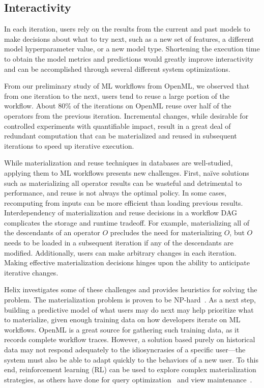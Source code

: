\documentclass[11pt,dvipdfmx]{article}
\newcommand{\topic}[1]{\vspace{-3.5pt}\smallskip \smallskip \noindent{\bf #1.}}
\newcommand{\helix}{{\sc Helix}\xspace}
\begin{document}
\subsection{Interactivity\label{sec:interact}}
In each iteration, users rely on the results from the current and past models to make decisions about what to try next, such as a new set of features, a different model hyperparameter value, or a new model type. Shortening the execution time to obtain the model metrics and predictions would greatly improve interactivity and can be accomplished through several different system optimizations.

\topic{Materialization and reuse}
From our preliminary study of ML workflows from OpenML, 
we observed that from one iteration to the next, 
users tend to reuse a large portion of the workflow. 
About 80\% of the iterations on OpenML reuse over half of the operators from the previous iteration. 
Incremental changes, while desirable for controlled experiments with quantifiable impact, 
result in a great deal of redundant computation that can be materialized and reused in subsequent iterations to speed up iterative execution.


While materialization and reuse techniques in databases are well-studied,
applying them to ML workflows presents new challenges. 
First, na{\"i}ve solutions such as materializing all operator results can be wasteful and detrimental to performance, and reuse is not always the optimal policy. 
In some cases, recomputing from inputs can be more efficient than loading previous results.
Interdependency of materialization and reuse decisions in a workflow DAG complicates the storage and runtime tradeoff. 
For example, materializing all of the descendants of an operator $O$ precludes the need for materializing $O$, 
but $O$ needs to be loaded in a subsequent iteration if any of the descendants are modified.
Additionally, users can make arbitrary changes in each iteration. 
Making effective materialization decisions hinges upon the ability to anticipate iterative changes.

\helix investigates some of these challenges and provides heuristics for solving the problem. 
The materialization problem is proven to be NP-hard~\cite{xin2018helix}. 
As a next step, building a predictive model of what users may do next 
may help prioritize what to materialize,
given enough training data on how developers iterate on ML workflows.
OpenML is a great source for gathering such training data, 
as it records complete workflow traces.
However, a solution based purely on historical data may not respond adequately to the idiosyncrasies of a specific user---the system 
must also be able to adapt quickly to the behaviors of a new user. 
To this end, reinforcement learning (RL) can be used to explore complex materialization strategies, as others have done for query optimization~\cite{krishnan2018learning} and view maintenance~\cite{liang2019opportunistic}.
\end{document}
